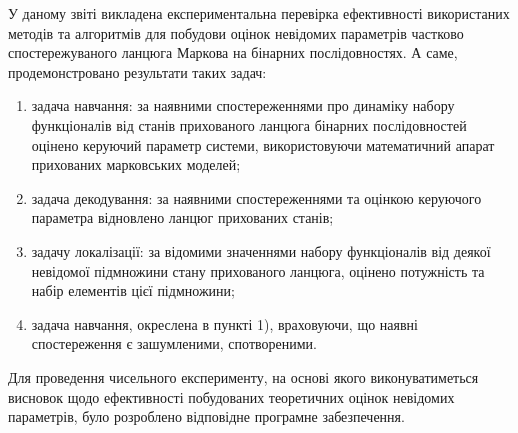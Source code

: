 
У даному звіті викладена експериментальна перевірка ефективності використаних методів та алгоритмів для побудови оцінок невідомих параметрів частково спостережуваного ланцюга Маркова на бінарних послідовностях. А саме, продемонстровано результати таких задач:

\begin{enumerate}
    \item задача навчання: за наявними спостереженнями про динаміку набору функціоналів від станів прихованого ланцюга бінарних послідовностей оцінено керуючий параметр системи, використовуючи математичний апарат прихованих марковських моделей;
    \item задача декодування: за наявними спостереженнями та оцінкою керуючого параметра відновлено ланцюг прихованих станів;
    \item задачу локалізації: за відомими значеннями набору функціоналів від деякої невідомої підмножини стану прихованого ланцюга, оцінено потужність та набір елементів цієї підмножини;
    \item задача навчання, окреслена в пункті 1), враховуючи, що наявні спостереження є зашумленими, спотвореними.
\end{enumerate}

Для проведення чисельного експерименту, на основі якого виконуватиметься висновок щодо ефективності побудованих теоретичних оцінок невідомих параметрів, було розроблено відповідне програмне забезпечення.